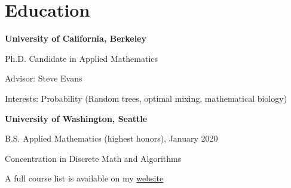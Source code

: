 \section{\sc Education}

{\bf University of California, Berkeley}\\
\vspace*{-.1in}
\begin{list1}
\item[] Ph.D. Candidate in Applied Mathematics
\begin{list2}
    \item[$\circ$] Advisor: Steve Evans
     \item[$\circ$]  Interests: Probability (Random trees, optimal mixing, mathematical biology)
\end{list2}

\end{list1}



{\bf University of Washington, Seattle}\\
\vspace*{-.1in}
\begin{list1}
\item[] B.S. Applied Mathematics (highest honors), January 2020 %


\begin{list2}
\vspace*{.05in}
\item[$\circ$] Concentration in Discrete Math and Algorithms


\end{list2}
\end{list1}

A full course list is available on my \href{https://math.berkeley.edu/~zmcnulty/}{website}


\endinput